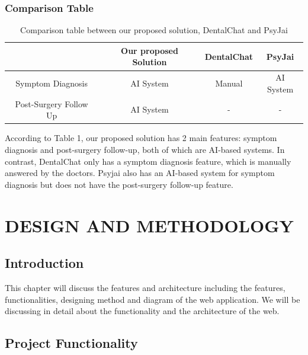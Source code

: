 \documentclass[12pt,oneside,openright,a4paper]{cpe-english-project}
\begin{document}
      \subsection{Comparison Table}
        \begin{table}[h]
          \centering
          \caption{\centering Comparison table between our proposed solution, DentalChat and PsyJai}\label{tab:Comparison_Table}
          \begin{tabular}{|c|c|c|c|} \hline
            & Our proposed Solution & DentalChat & PsyJai \\\hline
            Symptom Diagnosis & AI System & Manual & AI System \\\hline
            Post-Surgery Follow Up & AI System & - & - \\\hline
          \end{tabular}
        \end{table}
        \qquad According to Table 1, our proposed solution has 2 main features: symptom diagnosis and post-surgery follow-up, both of which are AI-based systems. In contrast, DentalChat only has a symptom diagnosis feature, which is manually answered by the doctors. Psyjai also has an AI-based system for symptom diagnosis but does not have the post-surgery follow-up feature.\par

\chapter{DESIGN AND METHODOLOGY}
  \section{Introduction}
  \qquad This chapter will discuss the features and architecture including the features, functionalities, designing method and diagram of the web application. We will be discussing in detail about the functionality and the architecture of the web. \par
  \section{Project Functionality}
\end{document}
